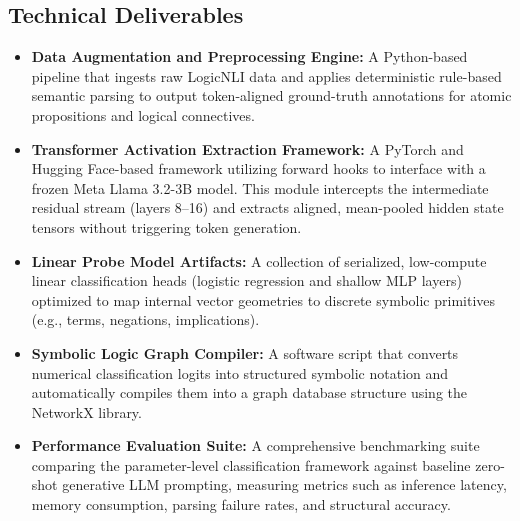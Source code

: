 \documentclass[12 pt]{article}  %
\begin{document}
\subsection{Technical Deliverables}
\begin{itemize}
    \item \textbf{Data Augmentation and Preprocessing Engine:} A Python-based pipeline that ingests raw LogicNLI data and applies deterministic rule-based semantic parsing to output token-aligned ground-truth annotations for atomic propositions and logical connectives.
    \item \textbf{Transformer Activation Extraction Framework:} A PyTorch and Hugging Face-based framework utilizing forward hooks to interface with a frozen Meta Llama 3.2-3B model. This module intercepts the intermediate residual stream (layers 8--16) and extracts aligned, mean-pooled hidden state tensors without triggering token generation.
    \item \textbf{Linear Probe Model Artifacts:} A collection of serialized, low-compute linear classification heads (logistic regression and shallow MLP layers) optimized to map internal vector geometries to discrete symbolic primitives (e.g., terms, negations, implications).
    \item \textbf{Symbolic Logic Graph Compiler:} A software script that converts numerical classification logits into structured symbolic notation and automatically compiles them into a graph database structure using the NetworkX library.
    \item \textbf{Performance Evaluation Suite:} A comprehensive benchmarking suite comparing the parameter-level classification framework against baseline zero-shot generative LLM prompting, measuring metrics such as inference latency, memory consumption, parsing failure rates, and structural accuracy.
\end{itemize}
\end{document}
